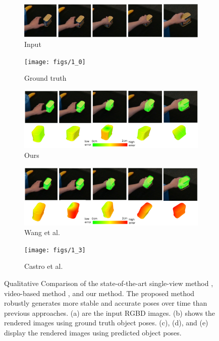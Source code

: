 \begin{figure}[!ht]
    \begin{subfigure}{0.98\textwidth}
        \includegraphics[width=\linewidth]{figs/1_rgb}
        \caption{Input}
    \end{subfigure}
    \hfill
    \begin{subfigure}{0.98\textwidth}
        \texttt{[image: figs/1\_0]}
        \caption{Ground truth}
    \end{subfigure}
    \hfill
    \begin{subfigure}{0.98\textwidth}
        \includegraphics[width=\linewidth]{figs/1_1}
        \caption{Ours}
    \end{subfigure}
    \hfill
    \begin{subfigure}{0.98\textwidth}
        \includegraphics[width=\linewidth]{figs/1_2}
        \caption{Wang et al. \cite{wang2023deep}}
    \end{subfigure}
    \hfill
    \begin{subfigure}{0.98\textwidth}
        \texttt{[image: figs/1\_3]}
        \caption{Castro et al. \cite{castro2023crt}}
    \end{subfigure}
    \caption{Qualitative Comparison of the state-of-the-art single-view method \cite{castro2023crt}, video-based method \cite{wang2023deep},
and our method. The proposed method robustly generates more stable and accurate poses over time than previous approaches. (a) are the input RGBD images. (b) shows the rendered images using ground truth object poses. (c), (d), and (e) display the rendered images using predicted object poses.}
    \label{fig:result1}
\end{figure}

